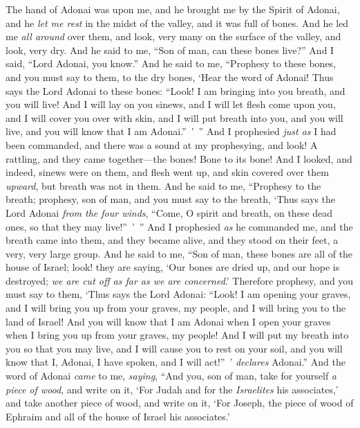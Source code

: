 \begin{biblechapter} %
 The hand of Adonai was upon me, and he brought me by the Spirit of Adonai, and he \textit{let me rest} in the midst of the valley, and it was full of bones.
\verse And he led me \textit{all around} over them, and look, very many on the surface of the valley, and look, very dry.
\verse And he said to me, “Son of man, can these bones live?” And I said, “Lord Adonai, you know.”
\verse And he said to me, “Prophesy to these bones, and you must say to them, to the dry bones, ‘Hear the word of Adonai!
\verse Thus says the Lord Adonai to these bones: “Look! I am bringing into you breath, and you will live!
\verse And I will lay on you sinews, and I will let flesh come upon you, and I will cover you over with skin, and I will put breath into you, and you will live, and you will know that I am Adonai.” ’ ”
\verse And I prophesied \textit{just as} I had been commanded, and there was a sound at my prophesying, and look! A rattling, and they came together—the bones! Bone to its bone!
\verse And I looked, and indeed, sinews were on them, and flesh went up, and skin covered over them \textit{upward}, but breath was not in them.
\verse And he said to me, “Prophesy to the breath; prophesy, son of man, and you must say to the breath, ‘Thus says the Lord Adonai \textit{from the four winds}, “Come, O spirit and breath, on these dead ones, so that they may live!” ’ ”
\verse And I prophesied \textit{as} he commanded me, and the breath came into them, and they became alive, and they stood on their feet, a very, very large group.
\verse And he said to me, “Son of man, these bones are all of the house of Israel; look! they are saying, ‘Our bones are dried up, and our hope is destroyed; \textit{we are cut off as far as we are concerned}.’
\verse Therefore prophesy, and you must say to them, ‘Thus says the Lord Adonai: “Look! I am opening your graves, and I will bring you up from your graves, my people, and I will bring you to the land of Israel!
\verse And you will know that I am Adonai when I open your graves when I bring you up from your graves, my people!
\verse And I will put my breath into you so that you may live, and I will cause you to rest on your soil, and you will know that I, Adonai, I have spoken, and I will act!” ’ \textit{declares} Adonai.”
\verse And the word of Adonai \textit{came} to me, \textit{saying},
\verse “And you, son of man, take for yourself \textit{a piece of wood}, and write on it, ‘For Judah and for the \textit{Israelites} his associates,’ and take another piece of wood, and write on it, ‘For Joseph, the piece of wood of Ephraim and all of the house of Israel his associates.’

\end{biblechapter}
